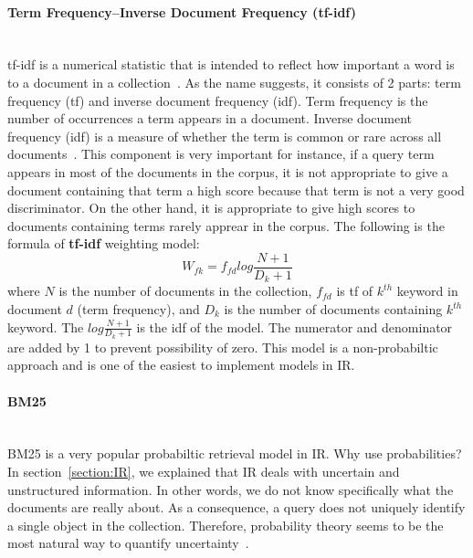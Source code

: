 \paragraph{Term Frequency–Inverse Document Frequency (tf-idf)} \hspace{0pt} \\
\indent tf-idf is a numerical statistic that is intended to reflect how important a word is to a document in a collection~\cite{tfidf}. As the name suggests, it consists
of 2 parts: term frequency (tf) and inverse document frequency (idf). Term frequency is the number of occurrences a term appears in a document.
Inverse document frequency (idf) is a measure of whether the term is common or rare across all documents~\cite{tfidf}.
This component is very important for instance, if a query term appears in most of the documents in the corpus, it is not appropriate to give a 
document containing that term a high score because that term is not a very good discriminator. On the other hand, it is appropriate to give high scores to 
documents containing terms rarely apprear in the corpus.
The following is the formula of \textbf{tf-idf} weighting model:
\begin{equation}
W_{fk} = f_{fd}log \frac{N + 1}{D_k + 1}
\end{equation}
where $N$ is the number of documents in the collection, $f_{fd}$ is tf of ${k^{th}}$ keyword in document $d$ (term frequency),
and $D_k$ is the number of documents containing ${k^{th}}$ keyword. The $log \frac{N + 1}{D_k + 1}$ is the idf of the model.
The numerator and denominator are added by 1 to prevent possibility of zero.
This model is a non-probabiltic approach and is one of the easiest to implement models in IR.

\paragraph{BM25} \hspace{0pt} \\
BM25 is a very popular probabiltic retrieval model in IR. Why use probabilities? 
In section~\ref{section:IR}, we explained that IR deals with uncertain and unstructured information. In other words, we do not know specifically
what the documents are really about. As a consequence, a query does not uniquely identify a single object in the collection. Therefore, probability theory
seems to be the most natural way to quantify uncertainty~\cite[P. 7]{probModel}.


